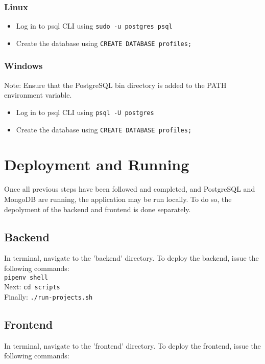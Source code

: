 \documentclass{article}
\newcommand{\code}[1]{\colorbox{light-gray}{\texttt{#1}}}
\begin{document}
\subsubsection*{Linux}
\begin{itemize}
    \item Log in to psql CLI using \code{sudo -u postgres psql}
    \item Create the database using \code{CREATE DATABASE profiles;}
\end{itemize}

\subsubsection*{Windows}
Note: Ensure that the PostgreSQL bin directory is added to the PATH environment variable.\\
\begin{itemize}
    \item Log in to psql CLI using \code{psql -U postgres}
    \item Create the database using \code{CREATE DATABASE profiles;}
\end{itemize}\section{Deployment and Running}
Once all previous steps have been followed and completed, and PostgreSQL and MongoDB are running, the application may be run locally. To do so,
the depolyment of the backend and frontend is done separately.
\subsection{Backend}
In terminal, navigate to the 'backend' directory. To deploy the backend, issue the following commands:\\ \code{pipenv shell}
\\Next: \code{cd scripts}\\
Finally: \code{./run-projects.sh}\\

\subsection{Frontend}
In terminal, navigate to the 'frontend' directory. To deploy the frontend, issue the following commands:\\
\end{document}
